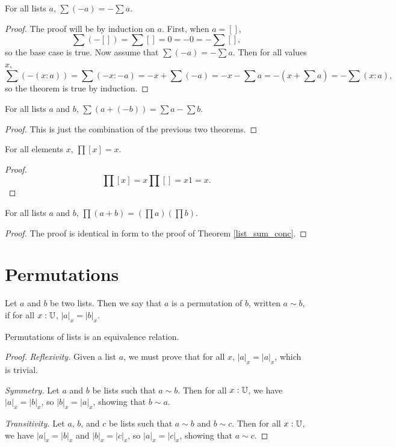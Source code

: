 \documentclass[../math.tex]{subfiles}
\begin{document}
\begin{theorem} \label{list_sum_neg}
    For all lists $a$, $\sum (-a) = -\sum a$.
\end{theorem}
\begin{proof}
    The proof will be by induction on $a$.  First, when $a = []$,
    \[
        \sum (-[]) = \sum [] = 0 = -0 = -\sum [],
    \]
    so the base case is true.  Now assume that $\sum (-a) = -\sum a$.  Then for
    all values $x$,
    \[
        \sum (-(x : a)) = \sum(-x : -a) = -x + \sum (-a) = -x - \sum a = -(x +
        \sum a) = -\sum (x : a),
    \]
    so the theorem is true by induction.
\end{proof}

\begin{theorem} \label{list_sum_minus}
    For all lists $a$ and $b$, $\sum (a + (-b)) = \sum a - \sum b$.
\end{theorem}
\begin{proof}
    This is just the combination of the previous two theorems.
\end{proof}

\begin{theorem}
    For all elements $x$, $\prod [x] = x$.
\end{theorem}
\begin{proof}
    \[
        \prod [x] = x \prod [] = x 1 = x.
    \]
\end{proof}

\begin{theorem} \label{list_prod_conc}
    For all lists $a$ and $b$, $\prod (a + b) = (\prod a) (\prod b)$.
\end{theorem}
\begin{proof}
    The proof is identical in form to the proof of Theorem \ref{list_sum_conc}.
\end{proof}

\section{Permutations}

\begin{definition}
    Let $a$ and $b$ be two lists.  Then we say that $a$ is a permutation of $b$,
    written $a \sim b$, if for all $x : \mathbb{U}$, $|a|_x = |b|_x$.
\end{definition}

\begin{instance}
    Permutations of lists is an equivalence relation.
\end{instance}
\begin{proof}
    \textit{Reflexivity.}  Given a list $a$, we must prove that for all $x$,
    $|a|_x = |a|_x$, which is trivial.

    \textit{Symmetry.}  Let $a$ and $b$ be lists such that $a \sim b$.  Then for
    all $x : \mathbb{U}$, we have $|a|_x = |b|_x$, so $|b|_x = |a|_x$, showing that $b
    \sim a$.

    \textit{Transitivity.} Let $a$, $b$, and $c$ be lists such that $a \sim b$
    and $b \sim c$.  Then for all $x : \mathbb{U}$, we have $|a|_x = |b|_x$ and $|b|_x =
    |c|_x$, so $|a|_x = |c|_x$, showing that $a \sim c$.
\end{proof}
\end{document}
